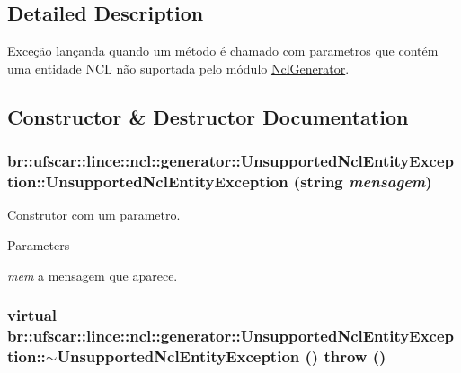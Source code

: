 \subsection{Detailed Description}
Exceção lançanda quando um método é chamado com parametros que contém uma entidade NCL não suportada pelo módulo \hyperlink{classbr_1_1ufscar_1_1lince_1_1ncl_1_1generator_1_1NclGenerator}{NclGenerator}. 

\subsection{Constructor \& Destructor Documentation}
\hypertarget{classbr_1_1ufscar_1_1lince_1_1ncl_1_1generator_1_1UnsupportedNclEntityException_a4868659a2fc88948780f072bb330200b}{
\subsubsection[{UnsupportedNclEntityException}]{\setlength{\rightskip}{0pt plus 5cm}br::ufscar::lince::ncl::generator::UnsupportedNclEntityException::UnsupportedNclEntityException (string {\em mensagem})}}
\label{classbr_1_1ufscar_1_1lince_1_1ncl_1_1generator_1_1UnsupportedNclEntityException_a4868659a2fc88948780f072bb330200b}


Construtor com um parametro. 


\begin{DoxyParams}{Parameters}
\item[{\em mem}]a mensagem que aparece. \end{DoxyParams}
\hypertarget{classbr_1_1ufscar_1_1lince_1_1ncl_1_1generator_1_1UnsupportedNclEntityException_a2be32ff1508c8af9d434090be4d62fe1}{
\subsubsection[{$\sim$UnsupportedNclEntityException}]{\setlength{\rightskip}{0pt plus 5cm}virtual br::ufscar::lince::ncl::generator::UnsupportedNclEntityException::$\sim$UnsupportedNclEntityException ()  throw ()}}
\label{classbr_1_1ufscar_1_1lince_1_1ncl_1_1generator_1_1UnsupportedNclEntityException_a2be32ff1508c8af9d434090be4d62fe1}


